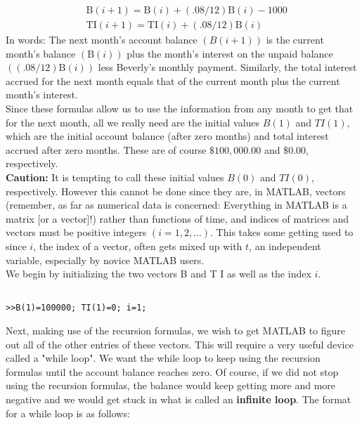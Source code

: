 \documentclass[../main.tex]{subfiles}
\begin{document}
$$
\begin{aligned}
&\mathrm{B}(i+1)=\mathrm{B}(i)+(.08 / 12) \mathrm{B}(i)-1000 \\
&\mathrm{TI}(i+1)=\mathrm{TI}(i)+(.08 / 12) \mathrm{B}(i)
\end{aligned}
$$
In words: The next month's account balance $(B(i+1))$ is the current month's balance $(\mathrm{B}(i))$ plus the month's interest on the unpaid balance $((.08 / 12) \mathrm{B}(i))$ less Beverly's monthly payment. Similarly, the total interest accrued for the next month equals that of the current month plus the current month's interest. \\

Since these formulas allow us to use the information from any month to get that for the next month, all we really need are the initial values $B(1)$ and $T I(1)$, which are the initial account balance (after zero months) and total interest accrued after zero months. These are of course $\$ 100,000.00$ and $\$ 0.00$, respectively.\\

\textbf{Caution:} It is tempting to call these initial values $B(0)$ and $T I(0)$, respectively. However this cannot be done since they are, in MATLAB, vectors (remember, as far as numerical data is concerned: Everything in MATLAB is a matrix [or a vector]!) rather than functions of time, and indices of matrices and vectors must be positive integers $(i=1,2, \ldots)$. This takes some getting used to since $i$, the index of a vector, often gets mixed up with $t$, an independent variable, especially by novice MATLAB users.\\

We begin by initializing the two vectors B and T I as well as the index $i$.

\begin{verbatim}

>>B(1)=100000; TI(1)=0; i=1; 

\end{verbatim}

Next, making use of the recursion formulas, we wish to get MATLAB to figure
out all of the other entries of these vectors. This will require a very useful device
called a "while loop". We want the while loop to keep using the recursion
formulas until the account balance reaches zero. Of course, if we did not stop
using the recursion formulas, the balance would keep getting more and more
negative and we would get stuck in what is called an \textbf{infinite loop}. The format for
a while loop is as follows: 
\end{document}
